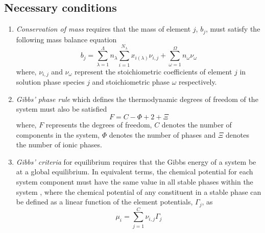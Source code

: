 	\subsection{Necessary conditions}
    	\begin{enumerate}\compresslist
        		\item \emph{Conservation of mass} requires that the mass of element $j$, $b_j$, must satisfy the following mass balance equation 
            	\begin{equation}
                		b_j = \sum_{\lambda=1}^{\Lambda} n_{\lambda}\sum_{i=1}^{N_{\lambda}}x_{i({\lambda})}{\nu}_{i,j} +  \sum_{\omega=1}^{\Omega} n_{\omega}{\nu}_{\omega}
            	\end{equation}
            	where, ${\nu}_{i,j}$ and ${\nu}_{\omega}$ represent the stoichiometric coefficients of element $j$ in solution phase species $j$ and stoichiometric phase $\omega$ respectively.
        		\item \emph{Gibbs' phase rule} which defines the thermodynamic degrees of freedom of the system must also be     satisfied
            	\begin{equation}
                		F=C-\Phi + 2 + \Xi
            	\end{equation}
            	where, $F$ represents the degrees of freedom, $C$ denotes the number of components in the system, $\Phi$ denotes the number of phases and $\Xi$ denotes the number of ionic phases.
        		\item \emph{Gibbs' criteria} for equilibrium requires that the Gibbs energy of a system be at a global equilibrium. In equivalent terms, the chemical potential for each system component must have the same value in all stable phases within the system \cite{HILLERT198131}, where the chemical potential of any constituent in a stable phase can be defined as a linear function of the element potentials, $\Gamma_j$, as
            	\begin{equation}
		        \mu_{i} = \sum_{j=1}^C \nu_{i,j} \Gamma_j                 
            	\end{equation}
    	\end{enumerate}


